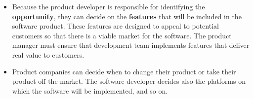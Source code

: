 \begin{itemize}
   \item Because the product developer is responsible for identifying the \textbf{opportunity}, they can decide on the \textbf{features} that will be included in the software product. These features are designed to appeal to potential customers so that there is a viable market for the software. The product manager must ensure that development team implements features that deliver real value to customers.
   \item Product companies can decide when to change their product or take their product off the market. The software developer decides also the platforms on which the software will be implemented, and so on.
\end{itemize}

